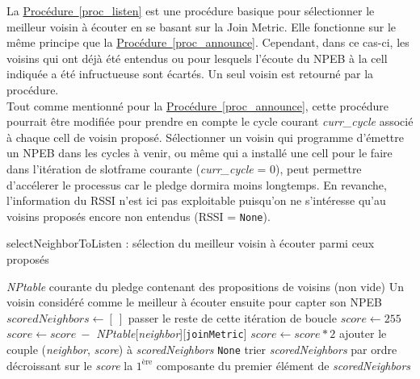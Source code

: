 \documentclass[]{report}
\newcommand{\wordlink}[2]{\hyperref[#2]{#1~\ref{#2}}}
\begin{document}
La \wordlink{Procédure}{proc_listen} est une procédure basique pour sélectionner le meilleur voisin à écouter en se basant sur la Join Metric. Elle fonctionne sur le même principe que la \wordlink{Procédure}{proc_announce}. Cependant, dans ce cas-ci, les voisins qui ont déjà été entendus ou pour lesquels l'écoute du NPEB à la cell indiquée a été infructueuse sont écartés. Un seul voisin est retourné par la procédure.\\

Tout comme mentionné pour la \wordlink{Procédure}{proc_announce}, cette procédure pourrait être modifiée pour prendre en compte le cycle courant \textit{curr\_cycle} associé à chaque cell de voisin proposé. Sélectionner un voisin qui programme d'émettre un NPEB dans les cycles à venir, ou même qui a installé une cell pour le faire dans l'itération de slotframe courante (\textit{curr\_cycle} = 0), peut permettre d'accélerer le processus car le pledge dormira moins longtemps. En revanche, l'information du RSSI n'est ici pas exploitable puisqu'on ne s'intéresse qu'au voisins proposés encore non entendus (RSSI = \texttt{None}).

\newpage

\begin{algorithm}[!h]
\caption{selectNeighborToListen : sélection du meilleur voisin à écouter parmi ceux proposés}
\begin{algorithmic}[1]
\Require \textit{NPtable} courante du pledge contenant des propositions de voisins (non vide)
\Ensure Un voisin considéré comme le meilleur à écouter ensuite pour capter son NPEB
\State $scoredNeighbors \leftarrow [\ ]$
\State passer le reste de cette itération de boucle
\Else
\State $score \leftarrow 255$
\State $score \leftarrow score\ - $ \textit{NPtable}[\textit{neighbor}][\texttt{joinMetric}]
\State $score \leftarrow score * 2$
\EndIf
\State ajouter le couple (\textit{neighbor}, \textit{score}) à \textit{scoredNeighbors}
\EndIf
\EndFor
{}
\State\Return \texttt{None}
\EndIf
\State trier \textit{scoredNeighbors} par ordre décroissant sur le \textit{score}
\State\Return la $1^{\text{ère}}$ composante du premier élément de \textit{scoredNeighbors}
\end{algorithmic}
\label{proc_listen}
\end{algorithm}
\end{document}
